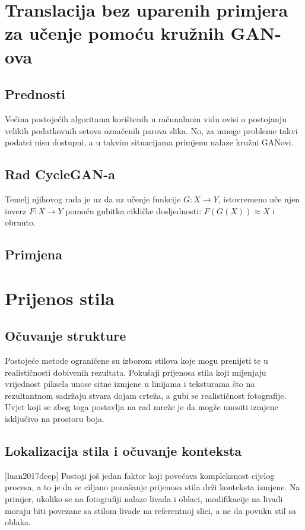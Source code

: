 \documentclass[lmodern, utf8, seminar]{fer}
\begin{document}
\chapter{Translacija bez uparenih primjera za učenje pomoću kružnih GAN-ova}
\section{Prednosti}
Većina postojećih algoritama korištenih u računalnom vidu ovisi o postojanju velikih podatkovnih setova označenih parova slika. No, za mnoge probleme takvi podatci nisu dostupni, a u takvim situacijama primjenu nalaze kružni GANovi.
\newline

\section{Rad CycleGAN-a}
Temelj njihovog rada je uz da uz učenje funkcije $G: X \rightarrow Y$, istovremeno uče njen inverz $F: X \rightarrow Y$ pomoću gubitka cikličke dosljednosti: $F(G(X)) \approx X$ i obrnuto.
\section{Primjena}


\chapter{Prijenos stila}
\section{Očuvanje strukture}
Postojeće metode ograničene su izborom stilova koje mogu prenijeti te u realističnosti dobivenih rezultata. Pokušaji prijenosa stila koji mijenjaju vrijednost piksela unose sitne izmjene u linijama i teksturama što na rezultantnom sadržaju stvara dojam crteža, a gubi se realističnost fotografije. Uvjet koji se zbog toga postavlja na rad mreže je da mogže unositi izmjene isključivo na prostoru boja.

\section{Lokalizacija stila i očuvanje konteksta} [luan2017deep]
Postoji još jedan faktor koji povećava kompleksnost cijelog procesa, a to je da se ciljano ponašanje prijenosa stila drži konteksta izmjene. Na primjer, ukoliko se na fotografiji nalaze livada i oblaci, modifikacije na livadi moraju biti povezane sa stilom livade na referentnoj slici, a ne da povuku stil sa oblaka. 
\end{document}

